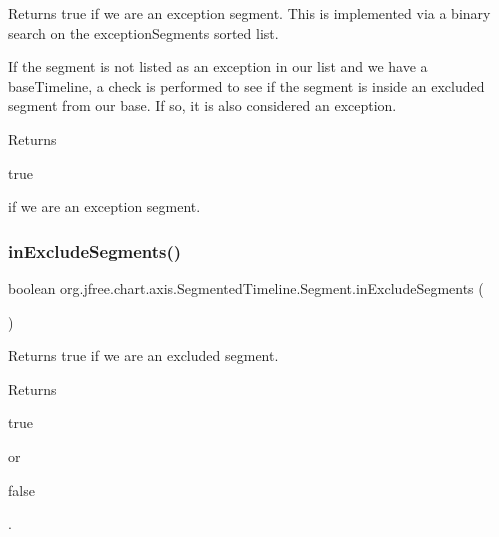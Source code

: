 Returns true if we are an exception segment. This is implemented via a binary search on the exception\+Segments sorted list.

If the segment is not listed as an exception in our list and we have a base\+Timeline, a check is performed to see if the segment is inside an excluded segment from our base. If so, it is also considered an exception.

\begin{DoxyReturn}{Returns}

\begin{DoxyCode}
\textcolor{keyword}{true} 
\end{DoxyCode}
 if we are an exception segment. 
\end{DoxyReturn}
\mbox{\label{classorg_1_1jfree_1_1chart_1_1axis_1_1_segmented_timeline_1_1_segment_aae1132faa6d9ad51d704f161881d601a}} 
\subsubsection{\texorpdfstring{in\+Exclude\+Segments()}{inExcludeSegments()}}
{\footnotesize\ttfamily boolean org.\+jfree.\+chart.\+axis.\+Segmented\+Timeline.\+Segment.\+in\+Exclude\+Segments (\begin{DoxyParamCaption}{ }\end{DoxyParamCaption})}

Returns true if we are an excluded segment.

\begin{DoxyReturn}{Returns}

\begin{DoxyCode}
\textcolor{keyword}{true} 
\end{DoxyCode}
 or
\begin{DoxyCode}
\textcolor{keyword}{false} 
\end{DoxyCode}
 . 
\end{DoxyReturn}
\mbox{\label{classorg_1_1jfree_1_1chart_1_1axis_1_1_segmented_timeline_1_1_segment_a82c16e4f51d18676b4832ef5f19fdbd2}} 
